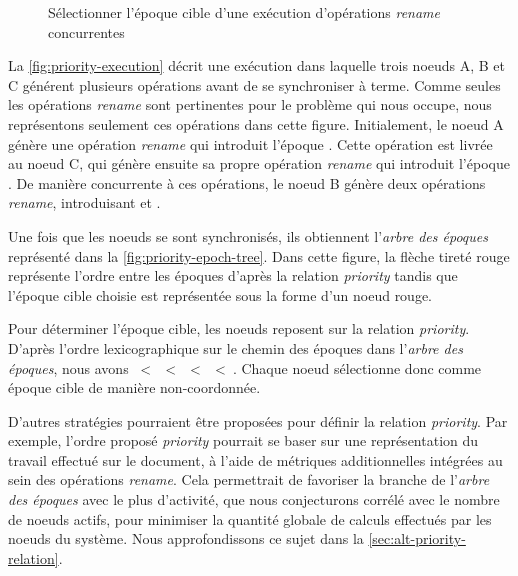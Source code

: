 \begin{figure}[!ht]
{\begin{minipage}{\linewidth}
          \label{fig:priority-epoch-tree}
      \end{minipage}}
  \caption{Sélectionner l'époque cible d'une exécution d'opérations \emph{rename} concurrentes}
  \label{fig:priority-example}
\end{figure}

La \autoref{fig:priority-execution} décrit une exécution dans laquelle trois noeuds A, B et C générent plusieurs opérations avant de se synchroniser à terme.
Comme seules les opérations \emph{rename} sont pertinentes pour le problème qui nous occupe, nous représentons seulement ces opérations dans cette figure.
Initialement, le noeud A génère une opération \emph{rename} qui introduit l'époque .
Cette opération est livrée au noeud C, qui génère ensuite sa propre opération \emph{rename} qui introduit l'époque .
De manière concurrente à ces opérations, le noeud B génère deux opérations \emph{rename}, introduisant  et .

Une fois que les noeuds se sont synchronisés, ils obtiennent l'\emph{arbre des époques} représenté dans la \autoref{fig:priority-epoch-tree}.
Dans cette figure, la flèche tireté rouge représente l'ordre entre les époques d'après la relation \emph{priority} tandis que l'époque cible choisie est représentée sous la forme d'un noeud rouge.

Pour déterminer l'époque cible, les noeuds reposent sur la relation \emph{priority}.
D'après l'ordre lexicographique sur le chemin des époques dans l'\emph{arbre des époques}, nous avons ~<~~<~~<~~<~.
Chaque noeud sélectionne donc  comme époque cible de manière non-coordonnée.

D'autres stratégies pourraient être proposées pour définir la relation \emph{priority}.
Par exemple, l'ordre proposé \emph{priority} pourrait se baser sur une représentation du travail effectué sur le document, à l'aide de métriques additionnelles intégrées au sein des opérations \emph{rename}.
Cela permettrait de favoriser la branche de l'\emph{arbre des époques} avec le plus d'activité, que nous conjecturons corrélé avec le nombre de noeuds actifs, pour minimiser la quantité globale de calculs effectués par les noeuds du système.
Nous approfondissons ce sujet dans la \autoref{sec:alt-priority-relation}.
